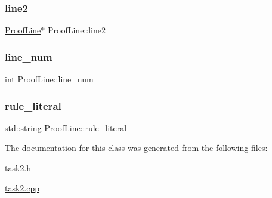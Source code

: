 \mbox{\label{classProofLine_afed6bbbe21b20cdbde9398eb73ccf15f}} 
\subsubsection{\texorpdfstring{line2}{line2}}
{\footnotesize\ttfamily \hyperlink{classProofLine}{Proof\+Line}$\ast$ Proof\+Line\+::line2}

\mbox{\label{classProofLine_af1e2b73ad5275235028a4b131e574aa7}} 
\subsubsection{\texorpdfstring{line\+\_\+num}{line\_num}}
{\footnotesize\ttfamily int Proof\+Line\+::line\+\_\+num}

\mbox{\label{classProofLine_acdc39e9e092a10ba3a6124f21c0eb420}} 
\subsubsection{\texorpdfstring{rule\+\_\+literal}{rule\_literal}}
{\footnotesize\ttfamily std\+::string Proof\+Line\+::rule\+\_\+literal}



The documentation for this class was generated from the following files\+:\begin{DoxyCompactItemize}
\item 
\hyperlink{task2_8h}{task2.\+h}\item 
\hyperlink{task2_8cpp}{task2.\+cpp}\end{DoxyCompactItemize}

